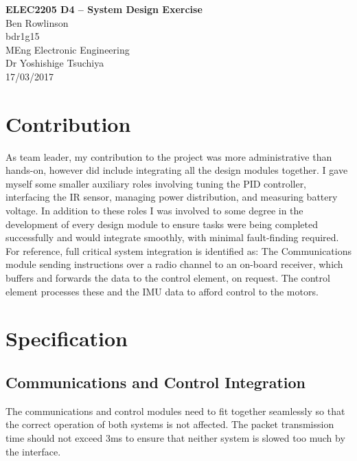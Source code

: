 \documentclass[a4paper,11pt]{article}
\begin{document}
  
\begin{center}
{\Large{\textbf{ELEC2205 D4 -- System Design Exercise}}} \\ [\baselineskip]
Ben Rowlinson\\
bdr1g15\\
MEng Electronic Engineering\\
Dr Yoshishige Tsuchiya\\
17/03/2017\\
\end{center}

\tableofcontents
\newpage
\listoffigures
\newpage
\mbox{}
\printnomenclature
\newpage

\section{Contribution}
As team leader, my contribution to the project was more administrative than hands-on, however did include integrating all the design modules together. I gave myself some smaller auxiliary roles involving tuning the PID controller, interfacing the IR sensor, managing power distribution, and measuring battery voltage. In addition to these roles I was involved to some degree in the development of every design module to ensure tasks were being completed successfully and would integrate smoothly, with minimal fault-finding required.\\ 
For reference, full critical system integration is identified as: The Communications module sending instructions over a radio channel to an on-board receiver, which buffers and forwards the data to the control element, on request. The control element processes these and the IMU data to afford control to the motors.\\
 
\section{Specification}
\subsection{Communications and Control Integration}
The communications and control modules need to fit together seamlessly so that the correct operation of both systems is not affected. The packet transmission time should not exceed 3ms to ensure that neither system is slowed too much by the interface.
\end{document}
